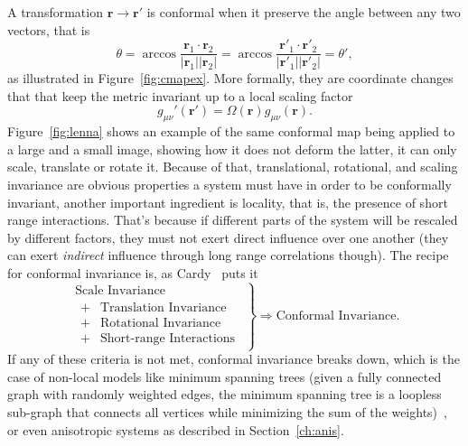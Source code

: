 A transformation $\mathbf{r}\rightarrow\mathbf{r}'$ is conformal when it
preserve the angle between any two vectors, that is
\begin{equation}
    \theta=
    \arccos\frac{\mathbf{r}_{1}\cdot\mathbf{r}_{2}}
                {\left|\mathbf{r}_{1}\right|\left|\mathbf{r}_{2}\right|}=
    \arccos\frac{\mathbf{r}'_{1}\cdot\mathbf{r}'_{2}}
                {\left|\mathbf{r}'_{1}\right|\left|\mathbf{r}'_{2}\right|}=
    \theta',
\end{equation}
as illustrated in Figure~\ref{fig:cmapex}. More formally, they are coordinate
changes that that keep the metric invariant up to a local scaling factor
\begin{equation}
    g_{\mu\nu}'\left(\mathbf{r}'\right)=
    \Omega\left(\mathbf{r}\right)g_{\mu\nu}\left(\mathbf{r}\right).
\end{equation}
Figure~\ref{fig:lenna} shows an example of the same conformal map being applied
to a large and a small image, showing how it does not deform the latter, it can
only scale, translate or rotate it. Because of that, translational, rotational,
and scaling invariance are obvious properties a system must have in order to be
conformally invariant, another important ingredient is locality, that is, the
presence of short range interactions. That's because if different parts of the
system will be rescaled by different factors, they must not exert direct
influence over one another (they can exert \textit{indirect} influence through
long range correlations though). The recipe for conformal invariance is, as
Cardy~\cite{Domb1972} puts it
\begin{equation*}
    \left.
        \begin{array}{l}
            \mbox{Scale Invariance}\\
            \begin{array}{cl}
                + & \mbox{Translation Invariance}\\
                + & \mbox{Rotational Invariance}\\
                + & \mbox{Short-range Interactions}
            \end{array}
        \end{array}
    \right\} \Rightarrow\mbox{Conformal Invariance}.
\end{equation*}
If any of these criteria is not met, conformal invariance breaks down, which is
the case of non-local models like minimum spanning trees (given a fully
connected graph with randomly weighted edges, the minimum spanning tree is a
loopless sub-graph that connects all vertices while minimizing the sum of the
weights)~\cite{Wilson2004}, or even anisotropic systems as described in
Section~\ref{ch:anis}.

